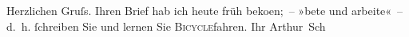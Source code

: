 \pstart
           Herzlichen Gruſs. Ihren Brief hab ich heute früh beko{\geminationm}en; – »bete und arbeite« – d. h. ſchreiben Sie und lernen Sie \textsc{Bicycle}fahren.\pend
           \pstart Ihr \spacefill\mbox{Arthur Sch}\pend{}\endnumbering{}  
      